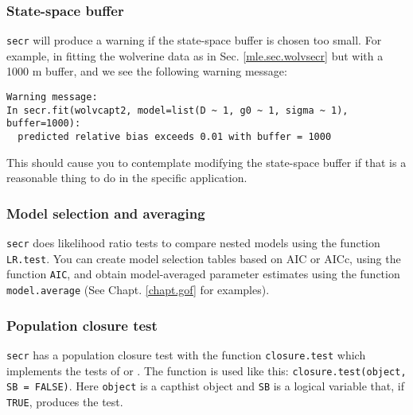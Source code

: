 \subsubsection{State-space buffer}
\mbox{\tt secr} 
will produce a warning if the state-space buffer is chosen too
small. For example, in fitting the wolverine data as in
Sec. \ref{mle.sec.wolvsecr} but with a 1000 m buffer, 
and we see the following warning message:
{\small
\begin{verbatim}
Warning message:
In secr.fit(wolvcapt2, model=list(D ~ 1, g0 ~ 1, sigma ~ 1), buffer=1000):
  predicted relative bias exceeds 0.01 with buffer = 1000
\end{verbatim}
}
{\flushleft This} should cause you to contemplate modifying the state-space buffer
if that is a reasonable thing to do in the specific application.


\subsubsection{Model selection and averaging}
\mbox{\tt secr} does likelihood ratio tests to compare nested models
using the function \mbox{\tt LR.test}.  You can create model selection
tables based on AIC or AICc, using the function \mbox{\tt AIC}, and obtain model-averaged parameter
estimates using the function \mbox{\tt model.average} (See Chapt. \ref{chapt.gof}
for examples).


\subsubsection{Population closure test}
\mbox{\tt secr} has a population closure test with the function
\mbox{\tt closure.test} which implements the tests of
\citet{stanley_burnham:1999} or \citet{otis_etal:1978}. The function
is used like this: \newline
\mbox{\tt closure.test(object, SB = FALSE)}.
Here \mbox{\tt object} is a 
capthist object and \mbox{\tt SB} is a logical variable that, if
\mbox{\tt TRUE},
produces the 
\citet{stanley_burnham:1999} test. 


